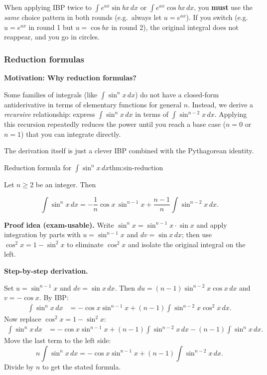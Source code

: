 \begin{examtip}[title={Exam Focus: Sign consistency in ``solve-for-the-integral''}]
When applying IBP twice to $\int e^{ax}\sin bx\,dx$ or $\int e^{ax}\cos bx\,dx$, you \textbf{must} use the \emph{same} choice pattern in both rounds (e.g.\ always let $u=e^{ax}$). If you switch (e.g.\ $u=e^{ax}$ in round 1 but $u=\cos bx$ in round 2), the original integral does not reappear, and you go in circles.
\end{examtip}

\newpage
\subsubsection*{Reduction formulas}

\textbf{Motivation: Why reduction formulas?}

Some families of integrals (like $\int \sin^n x\,dx$) do not have a closed-form antiderivative in terms of elementary functions for general $n$. Instead, we derive a \emph{recursive} relationship: express $\int \sin^n x\,dx$ in terms of $\int \sin^{n-2}x\,dx$. Applying this recursion repeatedly reduces the power until you reach a base case ($n=0$ or $n=1$) that you can integrate directly.

The derivation itself is just a clever IBP combined with the Pythagorean identity.

\begin{theorem}{Reduction formula for $\displaystyle \int \sin^n x\,dx$}{thm:sin-reduction}

Let $n\ge 2$ be an integer. Then

\[
\int \sin^n x\,dx
= -\frac{1}{n}\cos x\,\sin^{n-1}x+\frac{n-1}{n}\int \sin^{n-2}x\,dx.
\]

\end{theorem}

\noindent
\textbf{Proof idea (exam-usable).} Write $\sin^n x=\sin^{n-1}x\cdot \sin x$ and apply integration by parts with
$u=\sin^{n-1}x$ and $dv=\sin x\,dx$; then use $\cos^2x=1-\sin^2x$ to eliminate $\cos^2x$ and isolate the original integral on the left.

\textbf{Step-by-step derivation.}

Set $u = \sin^{n-1}x$ and $dv = \sin x\,dx$. Then $du = (n-1)\sin^{n-2}x\cos x\,dx$ and $v = -\cos x$. By IBP:
\begin{align*}
\int \sin^n x\,dx
&= -\cos x\sin^{n-1}x + (n-1)\int \sin^{n-2}x\cos^2 x\,dx.
\end{align*}
Now replace $\cos^2 x = 1 - \sin^2 x$:
\begin{align*}
\int \sin^n x\,dx
&= -\cos x\sin^{n-1}x + (n-1)\int \sin^{n-2}x\,dx - (n-1)\int \sin^n x\,dx.
\end{align*}
Move the last term to the left side:
\[
n\int \sin^n x\,dx = -\cos x\sin^{n-1}x + (n-1)\int \sin^{n-2}x\,dx.
\]
Divide by $n$ to get the stated formula.

